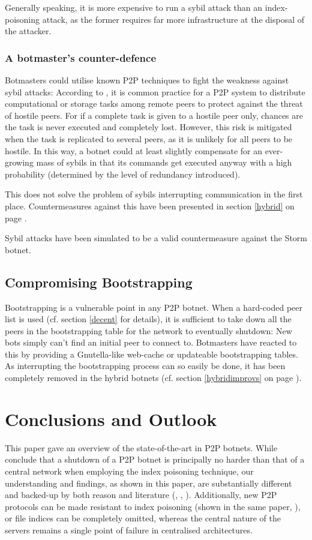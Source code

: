 \documentclass{llncs}
\begin{document}
Generally speaking, it is more expensive to run a sybil attack than an
index-poisoning attack, as the former requires far more infrastructure
at the disposal of the attacker.

\subsubsection{A botmaster's counter-defence}
Botmasters could utilise known P2P techniques to fight  the
weakness against sybil attacks: According to \cite{douceur2002sybil}, it is
common practice for a P2P system to distribute computational or
storage tasks among remote peers to protect against the threat of
hostile peers. For if a complete task is given to a hostile peer only,
chances are the task is never executed and completely lost. However,
this risk is mitigated when the task is replicated to several peers,
as it is unlikely for all peers to be hostile. In this way, a botnet
could at least slightly compensate for an ever-growing mass of sybils
in that its commands get executed anyway with a high probability
(determined by the level of redundancy introduced).

This does not solve the problem of sybils interrupting communication
in the first place. Countermeasures against this have been presented in
section \ref{hybrid} on page \pageref{hybrid}.

Sybil attacks have been simulated to be a valid countermeasure against
the Storm botnet.\cite{davis2008sybil}

\subsection{Compromising Bootstrapping}
Bootstrapping is a vulnerable point in any P2P botnet. When a
hard-coded peer list is used (cf. section \ref{decent} for details),
it is sufficient to take down all the peers in the bootstrapping table
for the network to eventually shutdown: New bots simply can't find an
initial peer to connect to. Botmasters have reacted to this by
providing a Gnutella-like web-cache or updateable bootstrapping
tables. As interrupting the bootstrapping process can so easily be
done, it has been completely removed in the hybrid botnets
(cf. section \ref{hybridimprovs} on page \pageref{hybridimprovs}).

\section{Conclusions and Outlook}
This paper gave an overview of the state-of-the-art in P2P
botnets. While \cite{wang2009systematic} conclude that a shutdown of a
P2P botnet is principally no harder than that of a central network
when employing the index poisoning technique, our understanding and
findings, as shown in this paper, are substantially different and
backed-up by both reason and literature (\cite{zou2006honeypot},
\cite{berger2009exploiting},
\cite{steggink2007detection}). Additionally, new P2P protocols can be
made resistant to index poisoning (shown in the same paper,
\cite{wang2009systematic}), or file indices can be completely omitted,
whereas the central nature of the servers remains a single point of
failure in centralised architectures.
\end{document}
